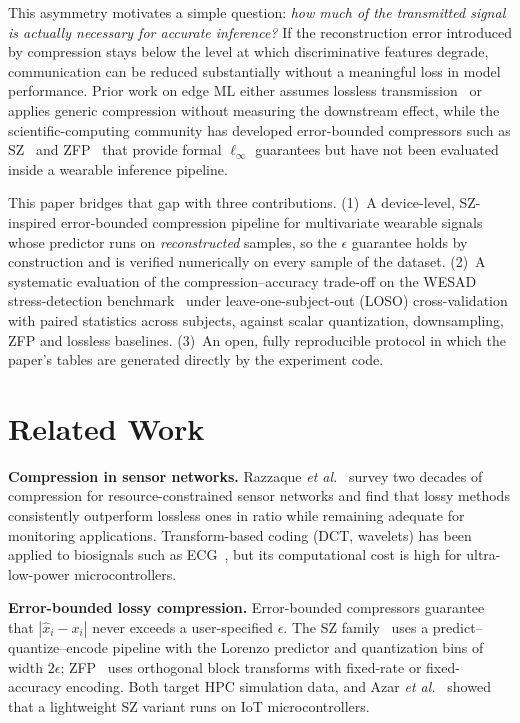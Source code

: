 \documentclass[conference]{IEEEtran}
\begin{document}
This asymmetry motivates a simple question: \emph{how much of the transmitted signal is actually necessary for accurate inference?} If the reconstruction error introduced by compression stays below the level at which discriminative features degrade, communication can be reduced substantially without a meaningful loss in model performance. Prior work on edge ML either assumes lossless transmission~\cite{li2018} or applies generic compression without measuring the downstream effect, while the scientific-computing community has developed error-bounded compressors such as SZ~\cite{tao2017} and ZFP~\cite{lindstrom2014} that provide formal $\ell_\infty$ guarantees but have not been evaluated inside a wearable inference pipeline.

This paper bridges that gap with three contributions. (1)~A device-level, SZ-inspired error-bounded compression pipeline for multivariate wearable signals whose predictor runs on \emph{reconstructed} samples, so the $\epsilon$ guarantee holds by construction and is verified numerically on every sample of the dataset. (2)~A systematic evaluation of the compression--accuracy trade-off on the WESAD stress-detection benchmark~\cite{schmidt2018} under leave-one-subject-out (LOSO) cross-validation with paired statistics across subjects, against scalar quantization, downsampling, ZFP and lossless baselines. (3)~An open, fully reproducible protocol in which the paper's tables are generated directly by the experiment code.

\section{Related Work}
\textbf{Compression in sensor networks.} Razzaque \emph{et al.}~\cite{razzaque2013} survey two decades of compression for resource-constrained sensor networks and find that lossy methods consistently outperform lossless ones in ratio while remaining adequate for monitoring applications. Transform-based coding (DCT, wavelets) has been applied to biosignals such as ECG~\cite{ramakrishnan1997}, but its computational cost is high for ultra-low-power microcontrollers.

\textbf{Error-bounded lossy compression.} Error-bounded compressors guarantee that $|\hat{x}_i-x_i|$ never exceeds a user-specified $\epsilon$. The SZ family~\cite{tao2017} uses a predict--quantize--encode pipeline with the Lorenzo predictor and quantization bins of width $2\epsilon$; ZFP~\cite{lindstrom2014} uses orthogonal block transforms with fixed-rate or fixed-accuracy encoding. Both target HPC simulation data, and Azar \emph{et al.}~\cite{azar2022} showed that a lightweight SZ variant runs on IoT microcontrollers.
\end{document}
